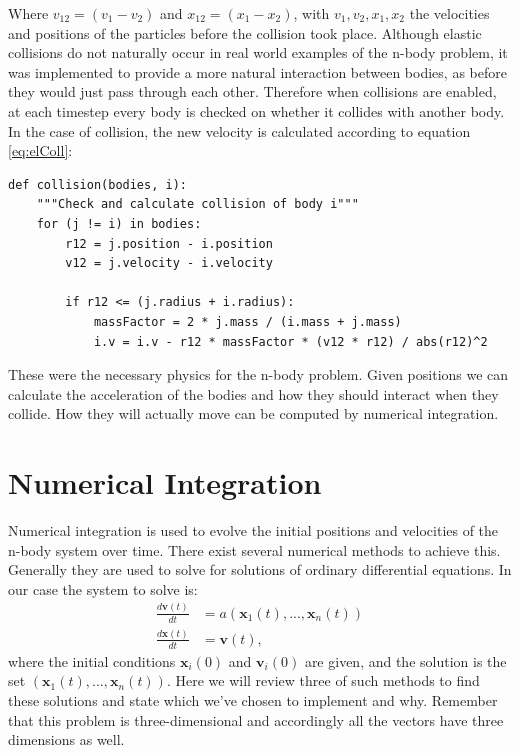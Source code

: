 \documentclass[a4paper]{article}
\newcommand{\vect}[1]{\boldsymbol{#1}}
\begin{document}
Where $v_{12} = (v_1 - v_2)$ and $x_{12} = (x_1 - x_2)$, with $v_1, v_2, x_1, x_2$ the velocities
and positions of the particles before the collision took place. Although elastic collisions do not
naturally occur in real world examples of the n-body problem, it was implemented to provide a more
natural interaction between bodies, as before they would just pass through each other. Therefore
when collisions are enabled, at each timestep every body is checked on whether it collides with
another body. In the case of collision, the new velocity is calculated according to equation
\ref{eq:elColl}:

\begin{verbatim}
def collision(bodies, i):
    """Check and calculate collision of body i"""
    for (j != i) in bodies:
        r12 = j.position - i.position
        v12 = j.velocity - i.velocity
        
        if r12 <= (j.radius + i.radius):
            massFactor = 2 * j.mass / (i.mass + j.mass)
            i.v = i.v - r12 * massFactor * (v12 * r12) / abs(r12)^2
\end{verbatim}

These were the necessary physics for the n-body problem. Given positions we can calculate the
acceleration of the bodies and how they should interact when they collide. How they will actually
move can be computed by numerical integration.

\section{Numerical Integration}
\label{sec:numerical}
Numerical integration is used to evolve the initial positions and velocities of the n-body system
over time. There exist several numerical methods to achieve this. Generally they are used to solve
for solutions of ordinary differential equations. In our case the system to solve is:
\begin{align} \label{eq:ode}
  \frac{d \vect{v}(t)}{dt} &=a(\vect{x}_{1}(t), ..., \vect{x}_{n}(t)) \nonumber \\
  \frac{d \vect{x}(t)}{dt} &= \vect{v}(t),
\end{align}
where the initial conditions $\vect{x}_{i}(0)$ and $\vect{v}_{i}(0)$ are given, and the solution is
the set $(\vect{x}_{1}(t), ..., \vect{x}_{n}(t))$. Here we will review three of such methods to find
these solutions and state which we've chosen to implement and why. Remember that this problem is
three-dimensional and accordingly all the vectors have three dimensions as well.
\end{document}
